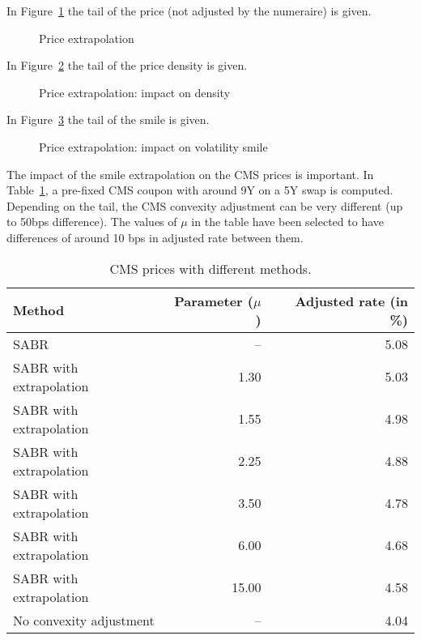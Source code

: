 \documentclass[]{amsart}
\begin{document}
In Figure~\ref{FigPrice} the tail of the price (not adjusted by the numeraire) is given.

\begin{figure}
\begin{center}
\end{center}
\caption{Price extrapolation}
\label{FigPrice}
\end{figure}

In Figure~\ref{FigDensity} the tail of the price density is given.

\begin{figure}
\begin{center}
\end{center}
\caption{Price extrapolation: impact on density}
\label{FigDensity}
\end{figure}

In Figure~\ref{FigSmile} the tail of the smile is given.

\begin{figure}
\begin{center}
\end{center}
\caption{Price extrapolation: impact on volatility smile}
\label{FigSmile}
\end{figure}

The impact of the smile extrapolation on the CMS prices is important. In Table~\ref{TabCMS}, a pre-fixed CMS coupon with around 9Y on a 5Y swap is computed. Depending on the tail, the CMS convexity adjustment can be very different (up to 50bps difference). The values of $\mu$ in the table have been selected to have differences of around 10 bps in adjusted rate between them. 

\begin{table}
\begin{tabular}{lrr}
Method & Parameter ($\mu$) & Adjusted rate (in \%) \\
\hline
SABR & -- & 5.08\\
SABR with extrapolation & 1.30 & 5.03\\
SABR with extrapolation & 1.55 & 4.98\\
SABR with extrapolation & 2.25 & 4.88\\
SABR with extrapolation & 3.50 & 4.78\\
SABR with extrapolation & 6.00 & 4.68\\
SABR with extrapolation & 15.00 & 4.58\\
No convexity adjustment & -- & 4.04
\end{tabular}
\caption{CMS prices with different methods.}
\label{TabCMS}
\end{table}
\end{document}
